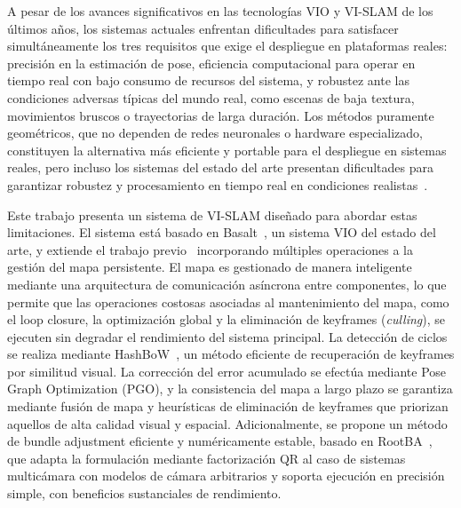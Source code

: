 A pesar de los avances significativos en las tecnologías VIO \cite{leutenegger2015okvis, usenko2020basalt} y VI-SLAM \cite{campos2021orbslam3, leutenegger2022okvis2, ruckert2021snakeslam} de los últimos años, los sistemas actuales enfrentan dificultades para satisfacer simultáneamente los tres requisitos que exige el despliegue en plataformas reales: precisión en la estimación de pose, eficiencia computacional para operar en tiempo real con bajo consumo de recursos del sistema, y robustez ante las condiciones adversas típicas del mundo real, como escenas de baja textura, movimientos bruscos o trayectorias de larga duración. Los métodos puramente geométricos, que no dependen de redes neuronales o hardware especializado, constituyen la alternativa más eficiente y portable para el despliegue en sistemas reales, pero incluso los sistemas del estado del arte presentan dificultades para garantizar robustez y procesamiento en tiempo real en condiciones realistas~\cite{demayo2025monadoslamdataset, krishnan2025lamaria}.

Este trabajo presenta un sistema de VI-SLAM diseñado para abordar estas limitaciones. El sistema está basado en Basalt~\cite{usenko2020basalt}, un sistema VIO del estado del arte, y extiende el trabajo previo~\cite{zanotti2024basaltxr} incorporando múltiples operaciones a la gestión del mapa persistente. El mapa es gestionado de manera inteligente mediante una arquitectura de comunicación asíncrona entre componentes, lo que permite que las operaciones costosas asociadas al mantenimiento del mapa, como el loop closure, la optimización global y la eliminación de keyframes (\textit{culling}), se ejecuten sin degradar el rendimiento del sistema principal. La detección de ciclos se realiza mediante HashBoW~\cite{stricker2024hashbow}, un método eficiente de recuperación de keyframes por similitud visual. La corrección del error acumulado se efectúa mediante Pose Graph Optimization (PGO), y la consistencia del mapa a largo plazo se garantiza mediante fusión de mapa y heurísticas de eliminación de keyframes que priorizan aquellos de alta calidad visual y espacial. Adicionalmente, se propone un método de bundle adjustment eficiente y numéricamente estable, basado en RootBA~\cite{demmel2021largescalerootba}, que adapta la formulación mediante factorización QR al caso de sistemas multicámara con modelos de cámara arbitrarios y soporta ejecución en precisión simple, con beneficios sustanciales de rendimiento.

